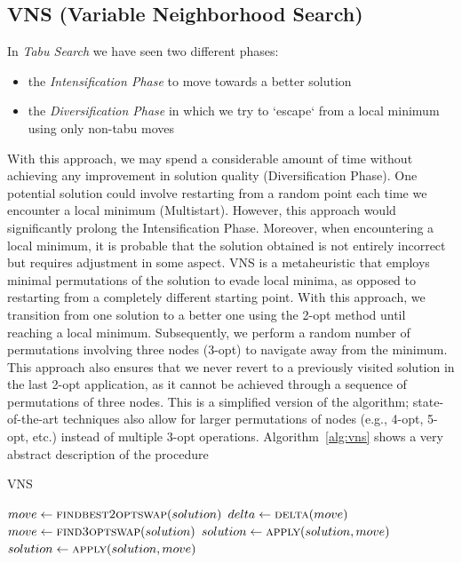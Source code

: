 \documentclass{article}
\begin{document}
\subsection{VNS (Variable Neighborhood Search)}
In \textit{Tabu Search} we have seen two different phases:
\begin{itemize}
	\item the \textit{Intensification Phase} to move towards a better solution
	\item the \textit{Diversification Phase} in which we try to `escape` from a local minimum using only
	non-tabu moves
\end{itemize}
With this approach, we may spend a considerable amount of time without achieving any improvement in 
solution quality (Diversification Phase). One potential solution could involve restarting from a random 
point each time we encounter a local minimum (Multistart). However, this approach would significantly 
prolong the Intensification Phase. Moreover, when encountering a local minimum, it is probable 
that the solution obtained is not entirely incorrect but requires adjustment in some aspect.
VNS is a metaheuristic that employs minimal permutations of the solution to evade local minima, as 
opposed to restarting from a completely different starting point.
With this approach, we transition from one solution to a better one using the 2-opt method until reaching 
a local minimum. Subsequently, we perform a random number of permutations involving three nodes (3-opt)
to navigate away from the minimum. This approach also ensures that we never revert to a previously visited
solution in the last 2-opt application, as it cannot be achieved through a sequence of permutations of
three nodes.
This is a simplified version of the algorithm; state-of-the-art techniques also allow for larger permutations
of nodes (e.g., 4-opt, 5-opt, etc.) instead of multiple 3-opt operations.
Algorithm~\ref{alg:vns} shows a very abstract description of the procedure

\begin{algorithm}[h]
\caption{VNS}
\label{alg:vns}
\begin{algorithmic}
    \State{}

        \State $move \gets \Call{findbest2optswap}{solution}$
        \State $delta \gets \Call{delta}{move}$
				\State $move \gets \Call{find3optswap}{solution}$
		        \State $solution \gets \Call{apply}{solution, move}$
			\EndFor
		\Else
			\State $solution \gets \Call{apply}{solution, move}$
		\EndIf
    \EndWhile

  \EndProcedure

\end{algorithmic}
\end{algorithm}
\end{document}
